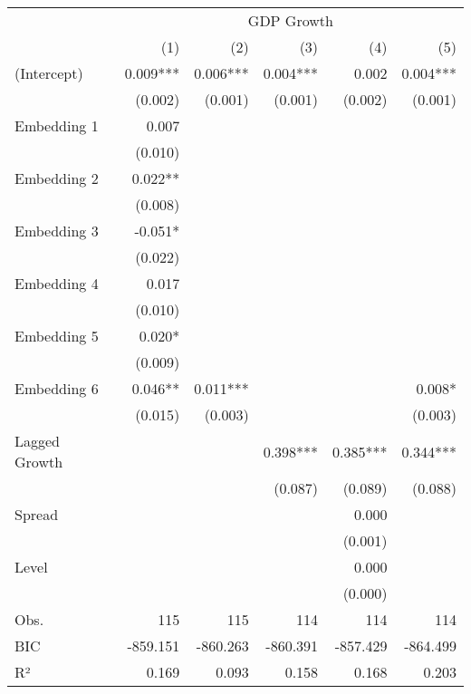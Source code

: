 \begin{tabular}{lrrrrr}
\toprule
              &            \multicolumn{5}{c}{GDP Growth}            \\ 
\cmidrule(lr){2-6} 
              &      (1) &      (2) &      (3) &      (4) &      (5) \\ 
\midrule
(Intercept)   & 0.009*** & 0.006*** & 0.004*** &    0.002 & 0.004*** \\ 
              &  (0.002) &  (0.001) &  (0.001) &  (0.002) &  (0.001) \\ 
Embedding 1   &    0.007 &          &          &          &          \\ 
              &  (0.010) &          &          &          &          \\ 
Embedding 2   &  0.022** &          &          &          &          \\ 
              &  (0.008) &          &          &          &          \\ 
Embedding 3   &  -0.051* &          &          &          &          \\ 
              &  (0.022) &          &          &          &          \\ 
Embedding 4   &    0.017 &          &          &          &          \\ 
              &  (0.010) &          &          &          &          \\ 
Embedding 5   &   0.020* &          &          &          &          \\ 
              &  (0.009) &          &          &          &          \\ 
Embedding 6   &  0.046** & 0.011*** &          &          &   0.008* \\ 
              &  (0.015) &  (0.003) &          &          &  (0.003) \\ 
Lagged Growth &          &          & 0.398*** & 0.385*** & 0.344*** \\ 
              &          &          &  (0.087) &  (0.089) &  (0.088) \\ 
Spread        &          &          &          &    0.000 &          \\ 
              &          &          &          &  (0.001) &          \\ 
Level         &          &          &          &    0.000 &          \\ 
              &          &          &          &  (0.000) &          \\ 
\midrule
Obs.          &      115 &      115 &      114 &      114 &      114 \\ 
BIC           & -859.151 & -860.263 & -860.391 & -857.429 & -864.499 \\ 
R²            &    0.169 &    0.093 &    0.158 &    0.168 &    0.203 \\ 
\bottomrule
\end{tabular}
